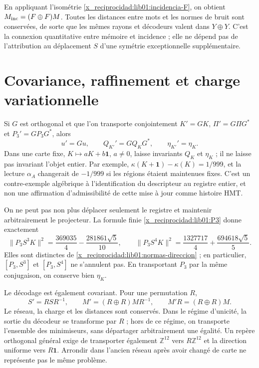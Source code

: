 En appliquant l’isométrie \eqref{x_reciprocidad:lib01:incidencia-F}, on obtient
\(M_{\rm inc}=(F\oplus F)M\). Toutes les distances entre mots
et les normes de bruit sont conservées, de sorte que les mêmes rayons et
décodeurs valent dans \(Y\oplus Y\). C’est la connexion
quantitative entre mémoire et incidence ; elle ne dépend pas de l’attribution au
déplacement \(S\) d’une symétrie exceptionnelle supplémentaire.

\section{Covariance, raffinement et charge variationnelle}
\label{x_reciprocidad:lib01:covarianza}

Si \(G\) est orthogonal et que l'on transporte conjointement \(K'=GK\), \(\Pi'=G\Pi G^*\) et \(P_3'=GP_3G^*\), alors
\[
 u'=Gu,\qquad Q_{K'}'=GQ_KG^*,\qquad \eta_{K'}'=\eta_K.
\]
Dans une carte fixe, \(K\mapsto aK+b\mathbf1\), \(a\ne0\), laisse invariants \(Q_K\) et \(\eta_K\) ; il ne laisse pas invariant l'objet entier. Par exemple, \(\kappa(K+\mathbf1)-\kappa(K)=1/999\), et la lecture \(\alpha_A\) changerait de \(-1/999\) si les régions étaient maintenues fixes. C'est un contre-exemple algébrique à l'identification du descripteur au registre entier, et non une affirmation d'admissibilité de cette mise à jour comme histoire HMT.

On ne peut pas non plus déplacer seulement le registre et maintenir arbitrairement le
projecteur. La formule finie \eqref{x_reciprocidad:lib01:P3} donne exactement
\[
 \|P_3S^3K\|^2=\frac{369035}{4}-\frac{281861\sqrt5}{10},
 \qquad
 \|P_3S^4K\|^2=\frac{1327717}{4}+\frac{694618\sqrt5}{5}.
\]
Elles sont distinctes de \eqref{x_reciprocidad:lib01:normas-direccion} ; en particulier,
\([P_3,S^3]\) et \([P_3,S^4]\) ne s’annulent pas. En transportant
\(P_3\) par la même conjugaison, on conserve bien \(\eta_K\).

Le décodage est également covariant. Pour une permutation \(R\),
\[
 S'=RSR^{-1},\qquad M'=(R\oplus R)MR^{-1},\qquad
 M'R=(R\oplus R)M.
\]
Le réseau, la charge et les distances sont conservés. Dans le régime d’unicité,
la sortie du décodeur se transforme par \(R\) ; hors de ce régime, on
transporte l’ensemble des minimiseurs, sans départager arbitrairement
une égalité. Un repère orthogonal général exige de transporter également
\(\mathbb Z^{12}\) vers \(R\mathbb Z^{12}\) et la direction uniforme
vers \(R\mathbf1\). Arrondir dans l’ancien réseau après avoir changé de
carte ne représente pas le même problème.

